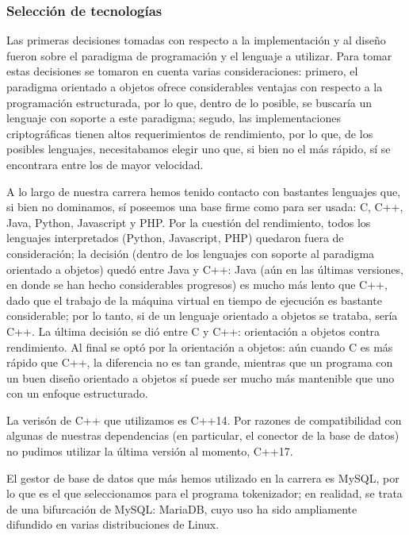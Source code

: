 \subsubsection{Selección de tecnologías}

Las primeras decisiones tomadas con respecto a la implementación y al diseño
fueron sobre el paradigma de programación y el lenguaje a utilizar. Para
tomar estas decisiones se tomaron en cuenta varias consideraciones: primero,
el paradigma orientado a objetos ofrece considerables ventajas con respecto
a la programación estructurada, por lo que, dentro de lo posible, se buscaría
un lenguaje con soporte a este paradigma; segudo, las implementaciones
criptográficas tienen altos requerimientos de rendimiento, por lo que, de los
posibles lenguajes, necesitabamos elegir uno que, si bien no el más rápido,
sí se encontrara entre los de mayor velocidad.

A lo largo de nuestra carrera hemos tenido contacto con bastantes lenguajes que,
si bien no dominamos, sí poseemos una base firme como para ser usada: C, C++,
Java, Python, Javascript y PHP. Por la cuestión del rendimiento, todos los
lenguajes interpretados (Python, Javascript, PHP) quedaron fuera de
consideración; la decisión (dentro de los lenguajes con soporte al paradigma
orientado a objetos) quedó entre Java y C++: Java (aún en las últimas versiones,
en donde se han hecho considerables progresos) es mucho más lento que C++,
dado que el trabajo de la máquina virtual en tiempo de ejecución es bastante
considerable; por lo tanto, si de un lenguaje orientado a objetos se trataba,
sería C++. La última decisión se dió entre C y C++: orientación a objetos contra
rendimiento. Al final se optó por la orientación a objetos: aún cuando C es
más rápido que C++, la diferencia no es tan grande, mientras que un programa
con un buen diseño orientado a objetos sí puede ser mucho más mantenible que
uno con un enfoque estructurado.

La verisón de C++ que utilizamos es C++14. Por razones de compatibilidad con
algunas de nuestras dependencias (en particular, el conector de la base de
datos) no pudimos utilizar la última versión al momento, C++17.

El gestor de base de datos que más hemos utilizado en la carrera es MySQL,
por lo que es el que seleccionamos para el programa tokenizador; en realidad,
se trata de una bifurcación de MySQL: MariaDB, cuyo uso ha sido ampliamente
difundido en varias distribuciones de Linux.
